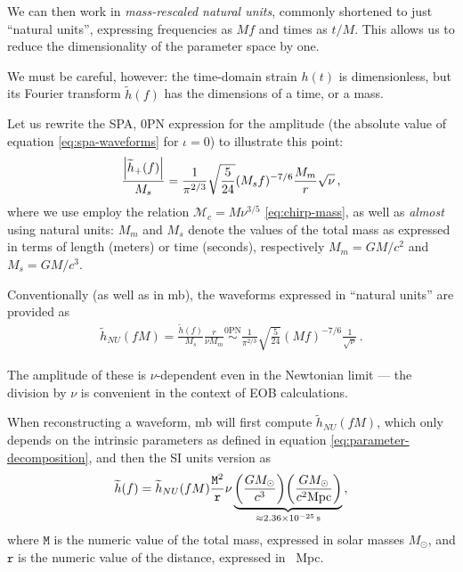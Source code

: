 \documentclass[main.tex]{subfiles}
\begin{document}
We can then work in \emph{mass-rescaled natural units}, commonly shortened to just ``natural units'', expressing frequencies as \(Mf\) and times as \(t / M\). This allows us to reduce the dimensionality of the parameter space by one. 

We must be careful, however: the time-domain strain \(h(t)\) is dimensionless, but its Fourier transform \(\widetilde{h}(f)\) has the dimensions of a time, or a mass.

Let us rewrite the \ac{SPA}, 0PN expression for the amplitude (the absolute value of equation \ref{eq:spa-waveforms} for \(\iota = 0\)) to illustrate this point: 
%
\begin{align}
\frac{\abs{\widetilde{h}_+ (f)}}{M_s} = \frac{1}{\pi^{2/3}} \sqrt{ \frac{5}{24}}
(M_s f)^{-7/6} \frac{M_m}{r} \sqrt{\nu }
\,,
\end{align}
%
where we use employ the relation \(\mathcal{M}_c = M \nu^{3/5}\) \eqref{eq:chirp-mass}, as well as \emph{almost} using natural units: \(M_m\) and \(M_s\) denote the values of the total mass as expressed in terms of length (meters) or time (seconds), respectively \(M_m = GM / c^2\) and \(M_s = GM / c^3\).

Conventionally (as well as in \ac{mb}), the waveforms expressed in ``natural units'' are provided as 
%
\begin{align}
\widetilde{h}_{NU} (fM) = \frac{\widetilde{h}(f)}{M_s} \frac{r}{\nu M_m} \overset{\text{0PN}}{\sim} \frac{1}{\pi^{2/3}} \sqrt{ \frac{5}{24}} (Mf)^{-7/6} \frac{1}{\sqrt{ \nu }}
\,.
\end{align}

The amplitude of these is  \(\nu \)-dependent even in the Newtonian limit --- the division by \(\nu \) is convenient in the context of \ac{EOB} calculations. 

When reconstructing a waveform, \ac{mb} will first compute \(\widetilde{h}_{NU} (fM)\), which only depends on the intrinsic parameters as defined in equation \eqref{eq:parameter-decomposition}, and then the \ac{SI} units version as 
%
\begin{align}
\widetilde{h}(f) 
= \widetilde{h}_{NU} (fM) \frac{\mathtt{M}^2}{\mathtt{r}} \nu 
\underbrace{\qty(\frac{G M_{\odot}}{c^3}) 
\qty(\frac{G M_{\odot}}{ c^2 \SI{}{Mpc} })}_{\approx \SI{2.36e-25}{s}}
\,,
\end{align}
%
where \(\mathtt{M}\) is the numeric value of the total mass, expressed in solar masses \(M_{\odot}\), and \(\mathtt{r}\) is the numeric value of the distance, expressed in \SI{}{Mpc}. 
\end{document}
